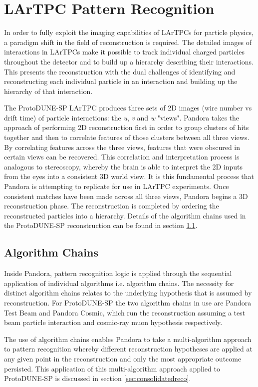 \section{LArTPC Pattern Recognition}
\label{sec:patrec}
In order to fully exploit the imaging capabilities of LArTPCs for particle physics, a paradigm shift in the field of reconstruction is required.  The detailed images of interactions in LArTPCs make it possible to track individual charged particles throughout the detector and to build up a hierarchy describing their interactions.  This presents the reconstruction with the dual challenges of identifying and reconstructing each individual particle in an interaction and building up the hierarchy of that interaction.

The ProtoDUNE-SP LArTPC produces three sets of 2D images (wire number vs drift time) of particle interactions: the \textit{u}, \textit{v} and \textit{w} "views".  Pandora takes the approach of performing 2D reconstruction first in order to group clusters of hits together and then to correlate features of those clusters between all three views.  By correlating features across the three views, features that were obscured in certain views can be recovered.  This correlation and interpretation process is analogous to stereoscopy, whereby the brain is able to interpret the 2D inputs from the eyes into a consistent 3D world view.  It is this fundamental process that Pandora is attempting to replicate for use in LArTPC experiments.  Once consistent matches have been made across all three views, Pandora begins a 3D reconstruction phase.  The reconstruction is completed by ordering the reconstructed particles into a hierarchy. Details of the algorithm chains used in the ProtoDUNE-SP reconstruction can be found in section \ref{sec:algchains}.

\subsection{Algorithm Chains}
\label{sec:algchains}
Inside Pandora, pattern recognition logic is applied through the sequential application of individual algorithms i.e. algorithm chains.  The necessity for distinct algorithm chains relates to the underlying hypothesis that is assumed by reconstruction.  For ProtoDUNE-SP the two algorithm chains in use are Pandora Test Beam and Pandora Cosmic, which run the reconstruction assuming a test beam particle interaction and cosmic-ray muon hypothesis respectively.

The use of algorithm chains enables Pandora to take a multi-algorithm approach to pattern recognition whereby different reconstruction hypotheses are applied at any given point in the reconstruction and only the most appropriate outcome persisted.  This application of this multi-algorithm approach applied to ProtoDUNE-SP is discussed in section \ref{sec:consolidatedreco}.

